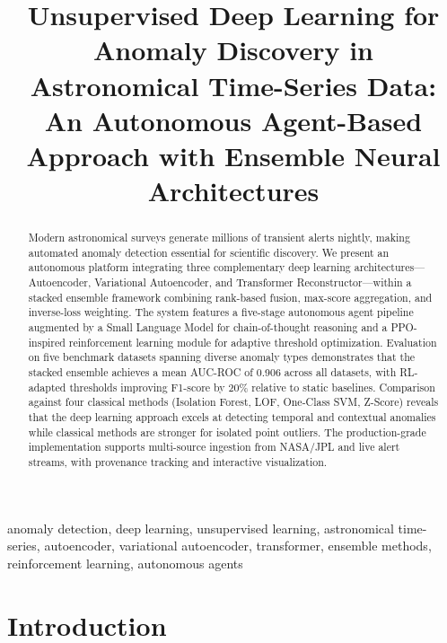 \documentclass[conference]{IEEEtran}
\begin{document}
\title{Unsupervised Deep Learning for Anomaly Discovery in Astronomical Time-Series Data: An Autonomous Agent-Based Approach with Ensemble Neural Architectures}

\author{
}

\maketitle

\begin{abstract}
Modern astronomical surveys generate millions of transient alerts nightly, making automated anomaly detection essential for scientific discovery. We present an autonomous platform integrating three complementary deep learning architectures---Autoencoder, Variational Autoencoder, and Transformer Reconstructor---within a stacked ensemble framework combining rank-based fusion, max-score aggregation, and inverse-loss weighting. The system features a five-stage autonomous agent pipeline augmented by a Small Language Model for chain-of-thought reasoning and a PPO-inspired reinforcement learning module for adaptive threshold optimization. Evaluation on five benchmark datasets spanning diverse anomaly types demonstrates that the stacked ensemble achieves a mean AUC-ROC of 0.906 across all datasets, with RL-adapted thresholds improving F1-score by 20\% relative to static baselines. Comparison against four classical methods (Isolation Forest, LOF, One-Class SVM, Z-Score) reveals that the deep learning approach excels at detecting temporal and contextual anomalies while classical methods are stronger for isolated point outliers. The production-grade implementation supports multi-source ingestion from NASA/JPL and live alert streams, with provenance tracking and interactive visualization.
\end{abstract}

\begin{IEEEkeywords}
anomaly detection, deep learning, unsupervised learning, astronomical time-series, autoencoder, variational autoencoder, transformer, ensemble methods, reinforcement learning, autonomous agents
\end{IEEEkeywords}

\section{Introduction}
\end{document}
